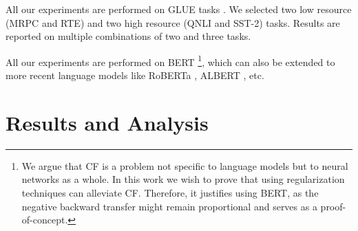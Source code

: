 \documentclass[11pt,a4paper]{article}
\begin{document}
All our experiments are performed on GLUE tasks \cite{wang2019glue}.  We selected two low resource  (MRPC and RTE) and two high resource  (QNLI and SST-2) tasks.  Results are reported on multiple combinations of two and three tasks.  

All our experiments are performed on BERT 
\footnote{We argue that CF is a problem not specific to language models but to neural networks as a whole. In this work we wish to prove that using regularization techniques can alleviate CF. Therefore, it justifies using BERT, as the negative backward transfer might remain proportional and serves as a proof-of-concept.}, which can also be extended to more recent language models like RoBERTa \cite{liu2019roberta}, ALBERT \cite{lan2019albert}, etc.

\section{Results and Analysis}
\label{sec:results}
\begin{table}[h!]
    \centering
    \caption{Low Resource Tasks. Representation:  0.87 (-0.48)$\rightarrow$0.64 meant the accuracy was 0.87 after the model is trained on $1^{st}$ task. It reduced by 0.48 after training on $2^{nd}$ task and the $2^{nd}$ task accuracy is 0.64. }
    \label{tab:low_resource_table}
\end{table}


\vspace{-0.3cm}
\end{document}
